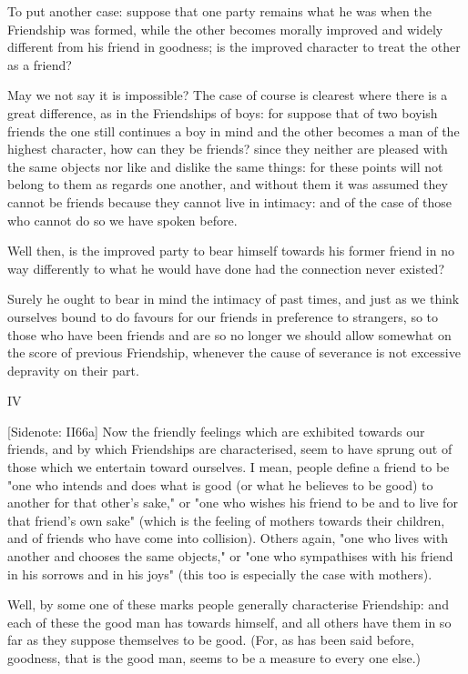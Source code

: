 To put another case: suppose that one party remains what he was when
the Friendship was formed, while the other becomes morally improved and
widely different from his friend in goodness; is the improved character
to treat the other as a friend?

May we not say it is impossible? The case of course is clearest where
there is a great difference, as in the Friendships of boys: for suppose
that of two boyish friends the one still continues a boy in mind and the
other becomes a man of the highest character, how can they be friends?
since they neither are pleased with the same objects nor like and
dislike the same things: for these points will not belong to them as
regards one another, and without them it was assumed they cannot be
friends because they cannot live in intimacy: and of the case of those
who cannot do so we have spoken before.

Well then, is the improved party to bear himself towards his former
friend in no way differently to what he would have done had the
connection never existed?

Surely he ought to bear in mind the intimacy of past times, and just as
we think ourselves bound to do favours for our friends in preference to
strangers, so to those who have been friends and are so no longer we
should allow somewhat on the score of previous Friendship, whenever the
cause of severance is not excessive depravity on their part.




IV

[Sidenote: II66a] Now the friendly feelings which are exhibited towards
our friends, and by which Friendships are characterised, seem to have
sprung out of those which we entertain toward ourselves. I mean, people
define a friend to be "one who intends and does what is good (or what
he believes to be good) to another for that other's sake," or "one who
wishes his friend to be and to live for that friend's own sake" (which
is the feeling of mothers towards their children, and of friends who
have come into collision). Others again, "one who lives with another and
chooses the same objects," or "one who sympathises with his friend in
his sorrows and in his joys" (this too is especially the case with
mothers).

Well, by some one of these marks people generally characterise
Friendship: and each of these the good man has towards himself, and all
others have them in so far as they suppose themselves to be good. (For,
as has been said before, goodness, that is the good man, seems to be a
measure to every one else.)

